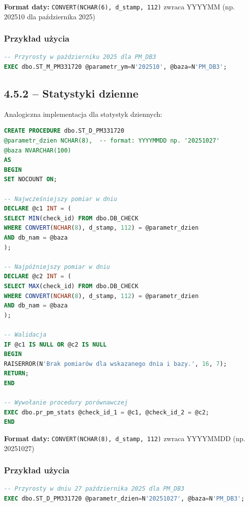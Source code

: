 \documentclass[a4paper,11pt]{article}
\begin{document}
	\textbf{Format daty:} \texttt{CONVERT(NCHAR(6), d\_stamp, 112)} zwraca YYYYMM (np. 202510 dla października 2025)
	
	\subsubsection{Przykład użycia}
	
	\begin{lstlisting}[language=SQL]
-- Przyrosty w październiku 2025 dla PM_DB3
EXEC dbo.ST_M_PM331720 @parametr_ym=N'202510', @baza=N'PM_DB3';
	\end{lstlisting}
	
	\subsection{4.5.2 -- Statystyki dzienne}
	
	Analogiczna implementacja dla statystyk dziennych:
	
	\begin{lstlisting}[language=SQL]
CREATE PROCEDURE dbo.ST_D_PM331720
@parametr_dzien NCHAR(8),  -- format: YYYYMMDD np. '20251027'
@baza NVARCHAR(100)
AS
BEGIN
SET NOCOUNT ON;
		
-- Najwcześniejszy pomiar w dniu
DECLARE @c1 INT = (
SELECT MIN(check_id) FROM dbo.DB_CHECK 
WHERE CONVERT(NCHAR(8), d_stamp, 112) = @parametr_dzien 
AND db_nam = @baza
);
		
-- Najpóźniejszy pomiar w dniu
DECLARE @c2 INT = (
SELECT MAX(check_id) FROM dbo.DB_CHECK 
WHERE CONVERT(NCHAR(8), d_stamp, 112) = @parametr_dzien 
AND db_nam = @baza
);
		
-- Walidacja
IF @c1 IS NULL OR @c2 IS NULL
BEGIN
RAISERROR(N'Brak pomiarów dla wskazanego dnia i bazy.', 16, 7);
RETURN;
END
		
-- Wywołanie procedury porównawczej
EXEC dbo.pr_pm_stats @check_id_1 = @c1, @check_id_2 = @c2;
END
	\end{lstlisting}
	
	\textbf{Format daty:} \texttt{CONVERT(NCHAR(8), d\_stamp, 112)} zwraca YYYYMMDD (np. 20251027)
	
	\subsubsection{Przykład użycia}
	
	\begin{lstlisting}[language=SQL]
-- Przyrosty w dniu 27 października 2025 dla PM_DB3
EXEC dbo.ST_D_PM331720 @parametr_dzien=N'20251027', @baza=N'PM_DB3';
	\end{lstlisting}
	
\end{document}
